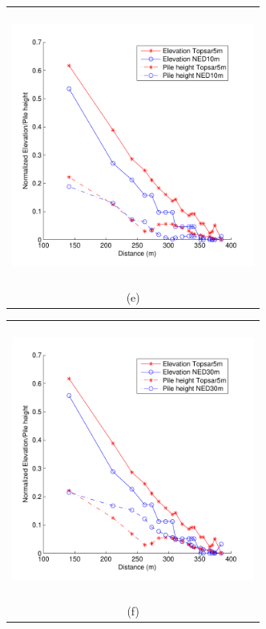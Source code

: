 \documentclass[12pt,letterpaper]{article}
\begin{document}
\begin{figure}[H]
\ContinuedFloat 
  \begin{minipage}[b]{0.5\textwidth}
    \begin{tabular}{c}
      \includegraphics[width=8cm,height=9cm,keepaspectratio]{plots/low_T5_N10.pdf}\\
      (e)
    \end{tabular}
  \end{minipage}
  \begin{minipage}{0.5\textwidth}
    \begin{tabular}{c}
      \includegraphics[width=8cm,height=9cm,keepaspectratio]{plots/low_T5_N30.pdf}\\
      (f)
    \end{tabular}
  \end{minipage}
  \begin{minipage}[b]{0.5\textwidth}

\end{minipage}
\end{figure}
\end{document}
